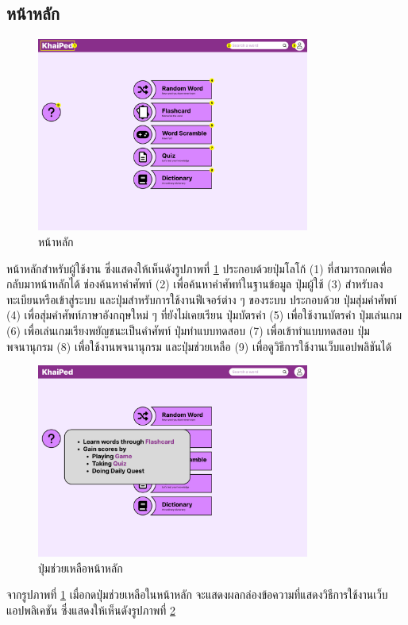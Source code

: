 \documentclass[12pt,oneside,openright,a4paper]{cpe-thai-project}
\begin{document}
\subsection{หน้าหลัก}
\begin{figure}[!h]\centering
	\includegraphics[width=0.8\textwidth, keepaspectratio=true]{image/chap3/ui/Home page.png}
	\caption{หน้าหลัก}\label{fig:UI_Home}
\end{figure}
\hspace{1cm}
หน้าหลักสำหรับผู้ใช้งาน ซึ่งแสดงให้เห็นดังรูปภาพที่ \ref{fig:UI_Home} ประกอบด้วยปุ่มโลโก้ (1) ที่สามารถกดเพื่อกลับมาหน้าหลักได้ ช่องค้นหาคำศัพท์ (2) เพื่อค้นหาคำศัพท์ในฐานข้อมูล
ปุ่มผู้ใช้ (3) สำหรับลงทะเบียนหรือเข้าสู่ระบบ และปุ่มสำหรับการใช้งานฟีเจอร์ต่าง ๆ ของระบบ ประกอบด้วย
ปุ่มสุ่มคำศัพท์ (4) เพื่อสุ่มคำศัพท์ภาษาอังกฤษใหม่ ๆ ที่ยังไม่เคยเรียน ปุ่มบัตรคำ (5) เพื่อใช้งานบัตรคำ ปุ่มเล่นเกม (6) เพื่อเล่นเกมเรียงพยัญชนะเป็นคำศัพท์
ปุ่มทำแบบทดสอบ (7) เพื่อเข้าทำแบบทดสอบ ปุ่มพจนานุกรม (8) เพื่อใช้งานพจนานุกรม และปุ่มช่วยเหลือ (9) เพื่อดูวิธีการใช้งานเว็บแอปพลิชันได้

\pagebreak
\begin{figure}[!h]\centering
	\includegraphics[width=0.8\textwidth, keepaspectratio=true]{image/chap3/ui/Home page - Help.png}
	\caption{ปุ่มช่วยเหลือหน้าหลัก}\label{fig:UI_HomeHelp}
\end{figure}
\hspace{1cm}
จากรูปภาพที่ \ref{fig:UI_Home} เมื่อกดปุ่มช่วยเหลือในหน้าหลัก จะแสดงผลกล่องข้อความที่แสดงวิธีการใช้งานเว็บแอปพลิเคชัน ซึ่งแสดงให้เห็นดังรูปภาพที่ \ref{fig:UI_HomeHelp}
\end{document}
